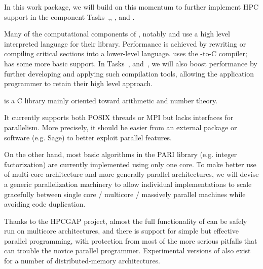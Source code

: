 \begin{workpackage}
\begin{wpdescription}
  In this work package, we will build on this momentum to further implement HPC support in
  the component Tasks~,,
  ,  and .


  
  Many of the computational components of \TheProject, notably \Sage
  and \GAP use a high level
  interpreted language for their library. Performance is achieved by
  rewriting or compiling critical sections into a lower-level
  language. \Sage uses
  the \Cython \Python-to-C compiler; \GAP has some more basic support.
  In Tasks~, 
  and~, we will also boost performance by
  further developing and applying such compilation tools, allowing the
  application programmer to retain their high level approach.

\end{wpdescription}
\begin{tasklist}
\begin{task}[title=PARI,id=hpc-pari, lead=UB]
  \Pari is a C library mainly oriented toward arithmetic and number theory.
  
  It currently supports both POSIX threads or MPI but lacks interfaces for
  parallelism. More precisely, it should be easier from an external package
  or software (e.g. Sage) to better exploit \Pari parallel features.

  On the other hand, most basic algorithms in the PARI library (e.g. integer
  factorization) are currently implemented using only one core. To
  make better use of multi-core architecture and more generally parallel
  architectures, we will devise a generic parallelization machinery
  to allow individual implementations to scale gracefully between single
  core / multicore / massively parallel machines while avoiding code
  duplication.
\end{task}


\begin{task}[title=GAP,id=hpc-gap, lead=SA]
  Thanks to the HPCGAP project, almost the full functionality of \GAP
  can be safely run on multicore architectures, and there is support for
  simple but effective parallel programming, with protection from most
  of the more serious pitfalls that can trouble the novice parallel
  programmer. Experimental versions of \GAP also exist for a number of
  distributed-memory architectures.



\end{task}
\end{tasklist}
\end{workpackage}
